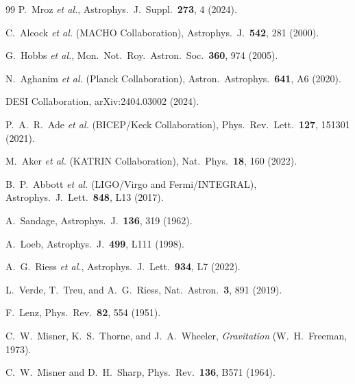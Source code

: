 \documentclass[aps,prd,twocolumn,superscriptaddress,nofootinbib,longbibliography]{revtex4-2}
\begin{document}
\begin{thebibliography}{99}
P.~Mroz \textit{et al.},
Astrophys.\ J.\ Suppl.\ \textbf{273}, 4 (2024).

C.~Alcock \textit{et al.} (MACHO Collaboration),
Astrophys.\ J.\ \textbf{542}, 281 (2000).

G.~Hobbs \textit{et al.},
Mon.\ Not.\ Roy.\ Astron.\ Soc.\ \textbf{360}, 974 (2005).

N.~Aghanim \textit{et al.} (Planck Collaboration),
Astron.\ Astrophys.\ \textbf{641}, A6 (2020).

DESI Collaboration,
arXiv:2404.03002 (2024).

P.~A.~R.~Ade \textit{et al.} (BICEP/Keck Collaboration),
Phys.\ Rev.\ Lett.\ \textbf{127}, 151301 (2021).


M.~Aker \textit{et al.} (KATRIN Collaboration),
Nat.\ Phys.\ \textbf{18}, 160 (2022).


B.~P.~Abbott \textit{et al.} (LIGO/Virgo and Fermi/INTEGRAL),
Astrophys.\ J.\ Lett.\ \textbf{848}, L13 (2017).


A.~Sandage,
Astrophys.\ J.\ \textbf{136}, 319 (1962).

A.~Loeb,
Astrophys.\ J.\ \textbf{499}, L111 (1998).

A.~G.~Riess \textit{et al.},
Astrophys.\ J.\ Lett.\ \textbf{934}, L7 (2022).

L.~Verde, T.~Treu, and A.~G.~Riess,
Nat.\ Astron.\ \textbf{3}, 891 (2019).


F.~Lenz,
Phys.\ Rev.\ \textbf{82}, 554 (1951).

C.~W.~Misner, K.~S.~Thorne, and J.~A.~Wheeler,
\textit{Gravitation} (W.~H.~Freeman, 1973).

C.~W.~Misner and D.~H.~Sharp,
Phys.\ Rev.\ \textbf{136}, B571 (1964).



\end{thebibliography}
\end{document}
